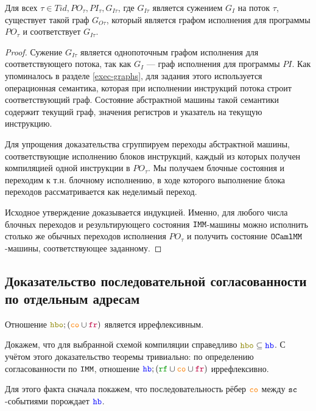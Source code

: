 \begin{lm} \label{corresponding-existence-single}
  Для всех $\tau\in Tid, PO_\tau, PI_\tau, G_{I\tau}$, где $G_{I\tau}$ является сужением $G_I$ на поток $\tau$, существует такой граф $G_{O\tau}$, который является графом исполнения для программы $PO_\tau$ и соответствует $G_{I\tau}$. 
\end{lm}
\begin{proof}
  Сужение $G_{I\tau}$ является однопоточным графом исполнения для соответствующего потока, так как $G_{I}$ --- граф исполнения для программы $PI$. Как упоминалось в разделе \ref{exec-graphs}, для задания этого используется операционная семантика, которая при исполнении инструкций потока строит соответствующий граф. Состояние абстрактной машины такой семантики содержит текущий граф, значения регистров и указатель на текущую инструкцию. 

  Для упрощения доказательства сгруппируем переходы абстрактной машины, соответствующие исполнению блоков инструкций, каждый из которых получен компиляцией одной инструкции в $PO_\tau$. Мы получаем блочные состояния и  переходим к т.н.  блочному исполнению, в ходе которого выполнение блока переходов рассматривается как неделимый переход.

  Исходное утверждение доказывается индукцией. Именно, для любого числа блочных переходов и результирующего состояния $\mathtt{IMM}$-машины можно исполнить столько же обычных переходов исполнения $PO_\tau$ и получить состояние $\mathtt{OCaml}\allowbreak \mathtt{MM}$-машины, соответствующее заданному.
\end{proof}


\subsection{Доказательство последовательной согласованности по отдельным адресам}
\label{corr-coherence}

\begin{thrm} \label{corr-coherence-thm}
  Отношение $\lHBO ; (\lCO\cup \lFR)$ является иррефлексивным. 
\end{thrm}
Докажем, что для выбранной схемой компиляции справедливо $\lHBO \subseteq \lHB$. С учётом этого доказательство теоремы тривиально: по определению согласованности по $\mathtt{IMM}$, отношение $\lHB ; (\lRF \cup \lCO \cup \lFR)$ иррефлексивно. 

Для этого факта сначала покажем, что последовательность рёбер $\lCO$ между ${\mathtt{sc}}$-событиями порождает $\lHB$.

